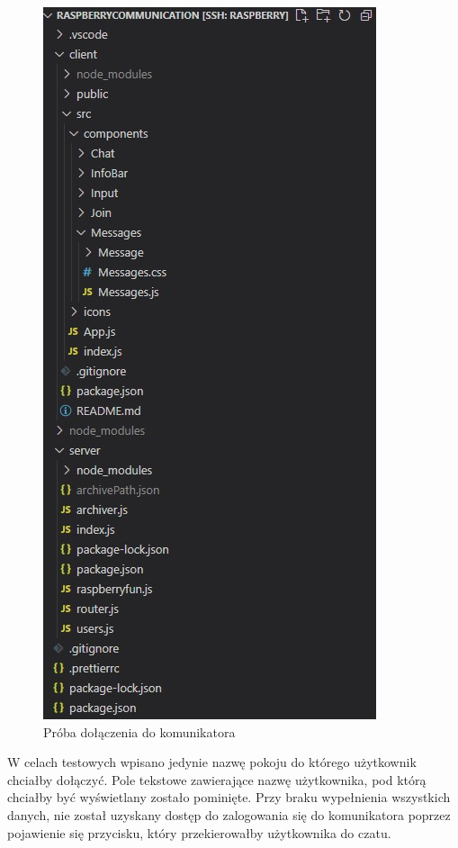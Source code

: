 \begin{figure}
	\centering
	\includegraphics[width=0.5\linewidth]{"obrazy/model"}
	\caption{Próba dołączenia do komunikatora}
	\label{fig:40}
\end{figure}
W celach testowych wpisano jedynie nazwę pokoju do którego użytkownik chciałby dołączyć. Pole tekstowe zawierające nazwę użytkownika, pod którą chciałby być wyświetlany zostało pominięte. Przy braku wypełnienia wszystkich danych, nie został uzyskany dostęp do zalogowania się do komunikatora poprzez pojawienie się przycisku, który przekierowałby użytkownika do czatu.
